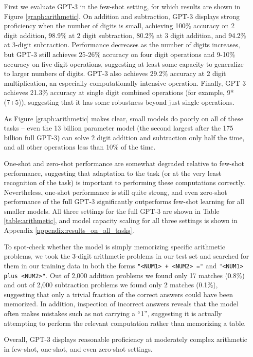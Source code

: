 First we evaluate GPT-3 in the few-shot setting, for which results are shown in Figure \ref{graph:arithmetic}.  On addition and subtraction, GPT-3 displays strong proficiency when the number of digits is small, achieving 100\% accuracy on 2 digit addition, 98.9\% at 2 digit subtraction, 80.2\% at 3 digit addition, and 94.2\% at 3-digit subtraction.  Performance decreases as the number of digits increases, but GPT-3 still achieves 25-26\% accuracy on four digit operations and 9-10\% accuracy on five digit operations, suggesting at least some capacity to generalize to larger numbers of digits.  GPT-3 also achieves 29.2\% accuracy at 2 digit multiplication, an especially computationally intensive operation. Finally, GPT-3 achieves 21.3\% accuracy at single digit combined operations (for example, 9*(7+5)), suggesting that it has some robustness beyond just single operations.




As Figure \ref{graph:arithmetic} makes clear, small models do poorly on all of these tasks -- even the 13 billion parameter model (the second largest after the 175 billion full GPT-3) can solve 2 digit addition and subtraction only half the time, and all other operations less than 10\% of the time.

One-shot and zero-shot performance are somewhat degraded relative to few-shot performance, suggesting that adaptation to the task (or at the very least recognition of the task) is important to performing these computations correctly.  Nevertheless, one-shot performance is still quite strong, and even zero-shot performance of the full GPT-3 significantly outperforms few-shot learning for all smaller models.  All three settings for the full GPT-3 are shown in Table \ref{table:arithmetic}, and model capacity scaling for all three settings is shown in Appendix \ref{appendix:results_on_all_tasks}.

To spot-check whether the model is simply memorizing specific arithmetic problems, we took the 3-digit arithmetic problems in our test set and searched for them in our training data in both the forms \texttt{"<NUM1> + <NUM2> ="} and \texttt{"<NUM1> plus <NUM2>"}.  Out of 2,000 addition problems we found only 17 matches (0.8\%) and out of 2,000 subtraction problems we found only 2 matches (0.1\%), suggesting that only a trivial fraction of the correct answers could have been memorized.  In addition, inspection of incorrect answers reveals that the model often makes mistakes such as not carrying a ``1'', suggesting it is actually attempting to perform the relevant computation rather than memorizing a table.

Overall, GPT-3 displays reasonable proficiency at moderately complex arithmetic in few-shot, one-shot, and even zero-shot settings.

